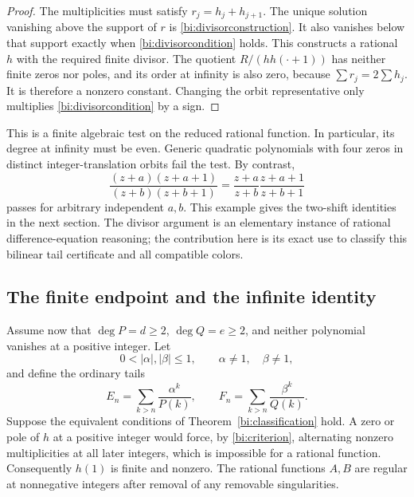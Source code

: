 \documentclass[11pt,letterpaper]{article}
\numberwithin{equation}{section}
\theoremstyle{definition}
\theoremstyle{remark}
\begin{document}
\begin{proof}
The multiplicities must satisfy $r_j=h_j+h_{j+1}$.
The unique solution vanishing above the support of $r$ is
\eqref{bi:divisorconstruction}. It also vanishes below that support
exactly when \eqref{bi:divisorcondition} holds. This constructs a
rational $h$ with the required finite divisor. The quotient
$R/(hh(\cdot+1))$ has neither finite zeros nor poles, and its order
at infinity is also zero, because $\sum r_j=2\sum h_j$.
It is therefore a nonzero constant. Changing the orbit representative
only multiplies \eqref{bi:divisorcondition} by a sign.
\end{proof}

This is a finite algebraic test on the reduced rational function. In
particular, its degree at infinity must be even. Generic quadratic
polynomials with four zeros in distinct integer-translation orbits
fail the test. By contrast,
\begin{equation}\label{bi:adjacent-ratio}
 \frac{(z+a)(z+a+1)}{(z+b)(z+b+1)}
       =\frac{z+a}{z+b}\frac{z+a+1}{z+b+1}
\end{equation}
passes for arbitrary independent $a,b$. This example gives the
two-shift identities in the next section. The divisor argument is an
elementary instance of rational difference-equation reasoning; the
contribution here is its exact use to classify this bilinear tail
certificate and all compatible colors.

\subsection{The finite endpoint and the infinite identity}

Assume now that $\deg P=d\ge2$, $\deg Q=e\ge2$, and neither polynomial
vanishes at a positive integer. Let
\[
 0<|\alpha|,|\beta|\le1,\qquad \alpha\ne1,\quad\beta\ne1,
\]
and define the ordinary tails
\begin{equation}\label{bi:tails}
 E_n=\sum_{k>n}\frac{\alpha^k}{P(k)},\qquad
 F_n=\sum_{k>n}\frac{\beta^k}{Q(k)}.
\end{equation}
Suppose the equivalent conditions of Theorem~\ref{bi:classification}
hold. A zero or pole of $h$ at a positive integer would force, by
\eqref{bi:criterion}, alternating nonzero multiplicities at all later
integers, which is impossible for a rational function. Consequently
$h(1)$ is finite and nonzero. The rational functions $A,B$ are regular
at nonnegative integers after removal of any removable singularities.
\end{document}
